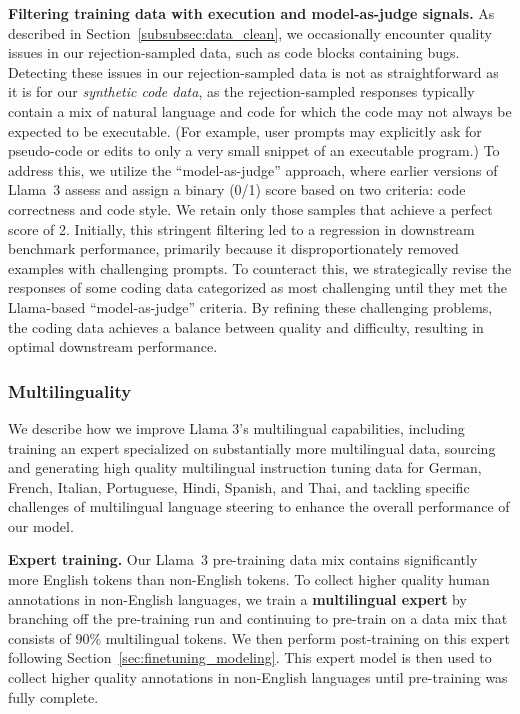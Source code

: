 \textbf{Filtering training data with execution and model-as-judge signals.} As described in Section~\ref{subsubsec:data_clean}, we occasionally encounter quality issues in our rejection-sampled data, such as code blocks containing bugs. Detecting these issues in our rejection-sampled data is not as straightforward as it is for our \emph{synthetic code data}, as the rejection-sampled responses typically contain a mix of natural language and code for which the code may not always be expected to be executable. (For example, user prompts may explicitly ask for pseudo-code or edits to only a very small snippet of an executable program.) To address this, we utilize the ``model-as-judge'' approach, where earlier versions of Llama~3 assess and assign a binary (0/1) score based on two criteria: code correctness and code style. We retain only those samples that achieve a perfect score of 2. Initially, this stringent filtering led to a regression in downstream benchmark performance, primarily because it disproportionately removed examples with challenging prompts. To counteract this, we strategically revise the responses of some coding data categorized as most challenging until they met the Llama-based ``model-as-judge'' criteria. By refining these challenging problems, the coding data achieves a balance between quality and difficulty, resulting in optimal downstream performance.

\subsubsection{Multilinguality}
\label{subsubsec:multilingual}
We describe how we improve Llama 3's multilingual capabilities, including training an expert specialized on substantially more multilingual data, sourcing and generating high quality multilingual instruction tuning data for German, French, Italian, Portuguese, Hindi, Spanish, and Thai, and tackling specific challenges of multilingual language steering to enhance the overall performance of our model. 

\textbf{Expert training.} Our Llama~3 pre-training data mix contains significantly more English tokens than non-English tokens. To collect higher quality human annotations in non-English languages, we train a \textbf{multilingual expert} by branching off the pre-training run and continuing to pre-train on a data mix that  consists of $90$\% multilingual tokens. We then perform post-training on this expert following Section~\ref{sec:finetuning_modeling}. This expert model is then used to collect higher quality annotations in non-English languages until pre-training was fully complete.


